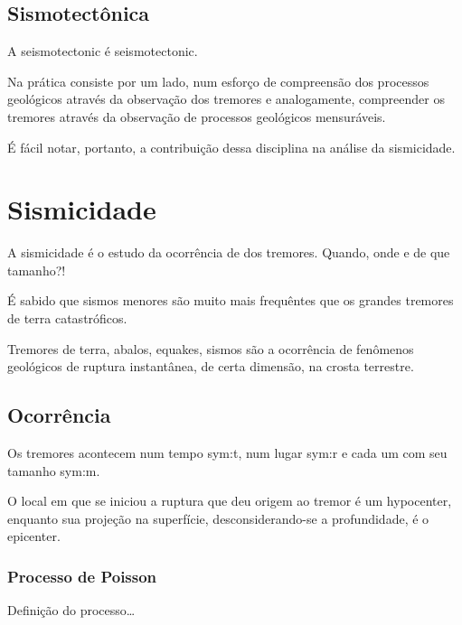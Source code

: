 \subsection{Sismotectônica}
\label{sec:sismotectonica}

A \gls{seismotectonic} é \glsdesc*{seismotectonic}. 

Na prática consiste por um lado, num esforço de compreensão dos
processos geológicos através da observação dos tremores e analogamente, compreender os tremores através da observação
de processos geológicos mensuráveis.  

É fácil notar, portanto, a contribuição dessa disciplina na análise da sismicidade.


\section{Sismicidade}
\label{sec:sismicidade}

A sismicidade é o estudo da ocorrência de dos tremores. Quando, onde e de que tamanho?!

É sabido que sismos menores são muito mais frequêntes que os grandes tremores de terra
catastróficos.

Tremores de terra, abalos, \glspl{equake}, sismos são a ocorrência de
fenômenos geológicos de ruptura instantânea, de certa dimensão, na
crosta terrestre.


\subsection{Ocorrência}
\label{sec:ocorrencia}
 
Os tremores acontecem num tempo \gls{sym:t}, num lugar \gls{sym:r} e cada um
com seu tamanho \gls{sym:m}.

O local em que se iniciou a ruptura que deu origem ao tremor é um \gls{hypocenter},
enquanto sua projeção na superfície, desconsiderando-se a profundidade, é o \gls{epicenter}.


\subsubsection{Processo de Poisson}
\label{sec:processo_de_Poisson}

Definição do processo\ldots

